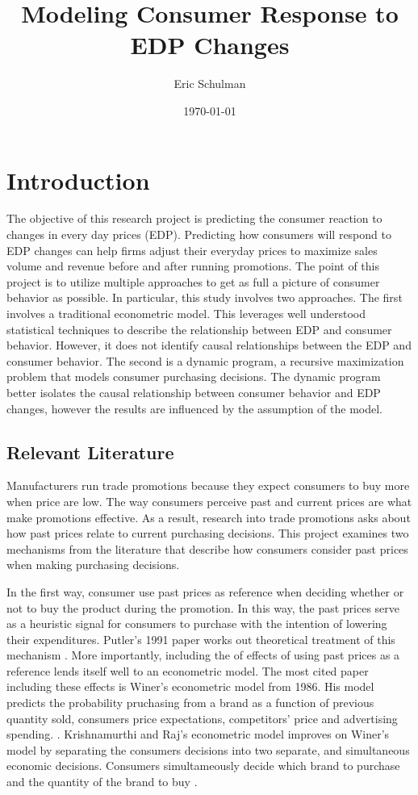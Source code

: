 \documentclass{article}
\title{Modeling Consumer Response to EDP Changes}
\author{Eric Schulman}
\date{\today}
\begin{document}
\maketitle

\section{Introduction}

The objective of this research project is predicting the consumer reaction to changes in every day prices (EDP). Predicting how consumers will respond to EDP changes can help firms adjust their everyday prices to maximize sales volume and revenue before and after running promotions. The point of this project is to utilize multiple approaches to get as full a picture of consumer behavior as possible. In particular, this study involves two approaches. The first involves a traditional econometric model. This leverages well understood statistical techniques to describe the relationship between EDP and consumer behavior. However, it does not identify causal relationships between the EDP and consumer behavior. The second is a dynamic program, a recursive maximization problem that models consumer purchasing decisions. The dynamic program better isolates the causal relationship between consumer behavior and EDP changes, however the results are influenced by the assumption of the model.

\subsection{Relevant Literature}

Manufacturers run trade promotions because they expect consumers to buy more when price are low. The way consumers perceive past and current prices are what make promotions effective. As a result, research into trade promotions asks about how past prices relate to current purchasing decisions.  This project examines two mechanisms from the literature that describe how consumers consider past prices when making purchasing decisions.

In the first way, consumer use past prices as reference when deciding whether or not to buy the product during the promotion. In this way, the past prices serve as a heuristic signal for consumers to purchase with the intention of lowering their expenditures. Putler's 1991 paper works out theoretical treatment of this mechanism \cite{putler}. More importantly, including the of effects of using past prices as a reference lends itself well to an econometric model. The most cited paper including these effects is Winer's econometric model from 1986. His model predicts the probability pruchasing from a brand as a function of previous quantity sold, consumers price expectations, competitors' price and advertising spending.  \cite{winer}. Krishnamurthi and Raj's econometric model improves on Winer's model by separating the consumers decisions into two separate, and simultaneous economic decisions. Consumers simultameously decide which  brand to purchase and the quantity of the brand to buy  \cite{krishnamurthi}.
\end{document}
